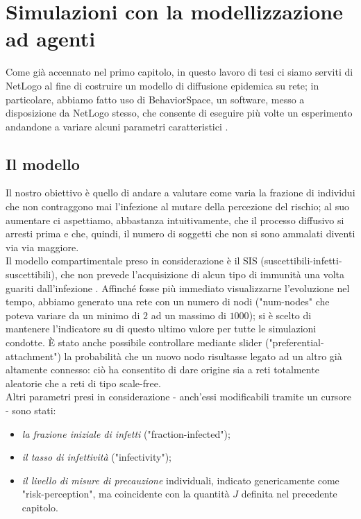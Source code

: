 \chapter{Simulazioni con la modellizzazione ad agenti}
\label{chap:cap4}
Come già accennato nel primo capitolo, in questo lavoro di tesi ci siamo serviti di NetLogo al fine di costruire un modello di diffusione epidemica su rete; in particolare, abbiamo fatto uso di BehaviorSpace, un software, messo a disposizione da NetLogo stesso, che consente di eseguire più volte un esperimento andandone a variare alcuni parametri caratteristici \cite{Wilensky2}. 
\section{Il modello}
Il nostro obiettivo è quello di andare a valutare come varia la frazione di individui che non contraggono mai l'infezione al mutare della percezione del rischio; al suo aumentare ci aspettiamo, abbastanza intuitivamente, che il processo diffusivo si arresti prima e che, quindi, il numero di soggetti che non si sono ammalati diventi via via maggiore. \\Il modello compartimentale preso in considerazione è il SIS (suscettibili-infetti-suscettibili), che non prevede l'acquisizione di alcun tipo di immunità una volta guariti dall'infezione \cite{Brauer}. Affinché fosse più immediato visualizzarne l'evoluzione nel tempo, abbiamo generato una rete con un numero di nodi ("num-nodes" che poteva variare da un minimo di $ 2 $ ad un massimo di $ 1000 $); si è scelto di mantenere l'indicatore su di questo ultimo valore per tutte le simulazioni condotte. \`{E} stato anche possibile controllare mediante slider ("preferential-attachment") la probabilità che un nuovo nodo risultasse legato ad un altro già altamente connesso: ciò ha consentito di dare origine sia a reti totalmente aleatorie che a reti di tipo scale-free. \\Altri parametri presi in considerazione - anch'essi modificabili tramite un cursore - sono stati:
\begin{itemize}
\item \textit{la frazione iniziale di infetti} ("fraction-infected");
\item \textit{il tasso di infettività} ("infectivity");
\item \textit{il livello di misure di precauzione} individuali, indicato genericamente come "risk-perception", ma coincidente con la quantità $ J $ definita nel precedente capitolo.
\end{itemize}
